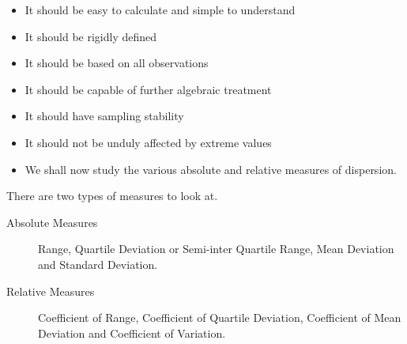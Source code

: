 \documentclass[
10pt, %
a4paper, %
]{report}
\begin{document}
\begin{itemize}
\item It should be easy to calculate and simple to understand
\item It should be rigidly defined
\item It should be based on all observations
\item It should be capable of further algebraic treatment
\item It should have sampling stability
\item It should not be unduly affected by extreme values
\item We shall now study the various absolute and relative measures of dispersion.
\end{itemize}

There are two types of measures to look at.
\begin{description}
\item[Absolute Measures] Range, Quartile Deviation or Semi-inter Quartile Range, Mean Deviation and Standard Deviation.
\item[Relative Measures] Coefficient of Range, Coefficient of Quartile Deviation, Coefficient of Mean Deviation and Coefficient of Variation.
\end{description}
\end{document}
